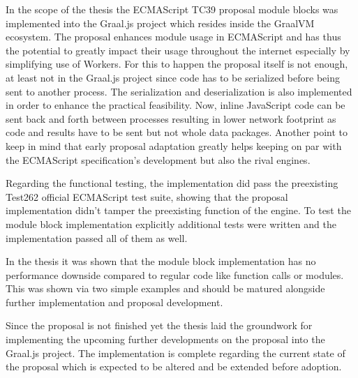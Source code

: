 
In the scope of the thesis the ECMAScript TC39 proposal module blocks was implemented into the Graal.js project which resides inside the GraalVM ecosystem. The proposal enhances module usage in ECMAScript and has thus the potential to greatly impact their usage throughout the internet especially by simplifying use of Workers. For this to happen the proposal itself is not enough, at least not in the Graal.js project since code has to be serialized before being sent to another process. The serialization and deserialization is also implemented in order to enhance the practical feasibility. Now, inline JavaScript code can be sent back and forth between processes resulting in lower network footprint as code and results have to be sent but not whole data packages. Another point to keep in mind that early proposal adaptation greatly helps keeping on par with the ECMAScript specification's development but also the rival engines. 

Regarding the functional testing, the implementation did pass the preexisting Test262 official ECMAScript test suite, showing that the proposal implementation didn't tamper the preexisting function of the engine. To test the module block implementation explicitly additional tests were written and the implementation passed all of them as well.

In the thesis it was shown that the module block implementation has no performance downside compared to regular code like function calls or modules. This was shown via two simple examples and should be matured alongside further implementation and proposal development. 

Since the proposal is not finished yet the thesis laid the groundwork for implementing the upcoming further developments on the proposal into the Graal.js project. The implementation is complete regarding the current state of the proposal which is expected to be altered and be extended before adoption.



